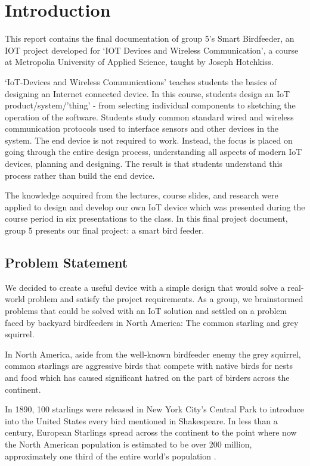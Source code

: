 \documentclass[12pt,a4paper]{article}
\begin{document}
\section{Introduction}
This report contains the final documentation of group 5’s Smart Birdfeeder, an IOT project developed for ‘IOT Devices and Wireless Communication’, a course at Metropolia University of Applied Science, taught by Joseph Hotchkiss. 

‘IoT-Devices and Wireless Communications’ teaches students the basics of designing an Internet connected device. In this course, students design an IoT product/system/’thing’ - from selecting individual components to sketching the operation of the software. Students study common standard wired and wireless communication protocols used to interface sensors and other devices in the system. The end device is not required to work. Instead, the focus is placed on going through the entire design process, understanding all aspects of modern IoT devices, planning and designing. The result is that students understand this process rather than build the end device.

The knowledge acquired from the lectures, course slides, and research were applied to design and develop our own IoT device which was presented during the course period in six presentations to the class. In this final project document, group 5 presents our final project: a smart bird feeder. 

\subsection{Problem Statement}
We decided to create a useful device with a simple design that would solve a real-world problem and satisfy the project requirements. As a group, we brainstormed problems that could be solved with an IoT solution and settled on a problem faced by backyard birdfeeders in North America: The common starling and grey squirrel. 

In North America, aside from the well-known birdfeeder enemy the grey squirrel, common starlings are aggressive birds that compete with native birds for nests and food which has caused significant hatred on the part of birders across the continent. 

In 1890, 100 starlings were released in New York City’s Central Park to introduce into the United States every bird mentioned in Shakespeare. In less than a century, European Starlings spread across the continent to the point where now the North American population is estimated to be over 200 million, approximately one third of the entire world’s population \cite{wbu}. 
\end{document}

